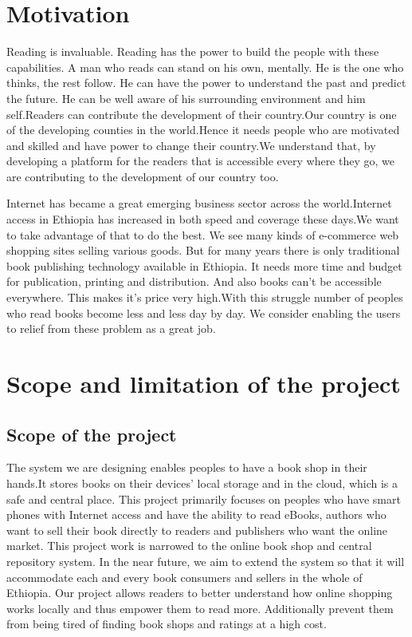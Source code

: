 \section{Motivation}
Reading is invaluable. Reading has the power to build the people with these capabilities. A man who reads can stand on his own, mentally. He is the one who thinks, the rest follow. He can have the power to understand the past and predict the future. He can be well aware of his surrounding environment and him self.Readers can contribute the development of their country.Our country is one of the developing counties in the world.Hence it needs people who are motivated and skilled and have power to change their country.We understand that, by developing a platform for the readers that is accessible every where they go, we are contributing to the development of our country too.

Internet has became a great emerging business sector across the world.Internet access in Ethiopia has increased in both speed and coverage these days.We want to take advantage of that to do the best. We see many kinds of e-commerce web shopping sites selling various goods. But for many years there is only traditional book publishing technology available in Ethiopia. It needs more time and budget for publication, printing and distribution. And also books can't be accessible everywhere. This makes it's price very high.With this struggle number of peoples who read books become less and less day by day. We consider enabling the users to relief from these problem as a great job.


	\section{Scope and limitation of the project}
		\subsection{Scope of the project}

The system we are designing enables peoples to have a book shop in their hands.It stores books on their devices' local storage and in the cloud, which is a safe and central place. This project primarily focuses on peoples who have smart phones with Internet access and have the ability to read eBooks, authors who want to sell their book directly to readers and publishers who want the online market. This project work is narrowed to the online book shop and central repository system. In the near future, we aim to extend the system so that it will accommodate each and every book consumers and sellers in the whole of Ethiopia. Our project allows readers to better understand how online shopping works locally and thus empower them to read more. Additionally prevent them from being tired of finding book shops and ratings at a high cost.

